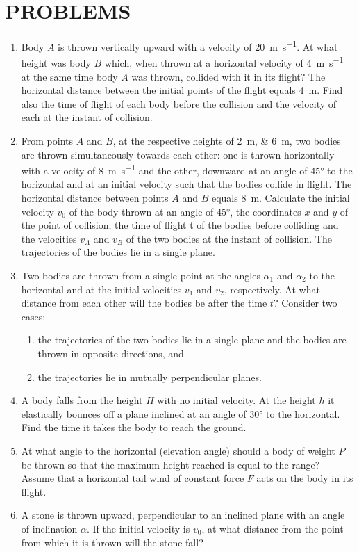 \documentclass[a4paper,sfsidenotes]{tufte-book}
\begin{document}
\section{PROBLEMS}
\label{problems-01}
\begin{enumerate}[series=problems]
\item Body $A$ is thrown vertically upward with a velocity of \SI[per-mode=symbol]{20}{\meter \per \second}. At what height was body $B$ which, when thrown at a horizontal velocity of  \SI[per-mode=symbol]{4}{\meter \per \second} at the same time body $A$ was thrown, collided with it in its
flight? The horizontal distance between the initial points of the flight equals \SI{4}{m}. Find also the time of flight of each body before the collision and the velocity of each at the instant of collision.
\item From points $A$ and $B$, at the respective heights of \SIlist{2;6}{\metre}, two bodies are thrown simultaneously towards each other: one is thrown horizontally with a velocity of \SI[per-mode=symbol]{8}{\meter \per \second} and the other, downward at an angle of \ang{45} to the horizontal and at an initial velocity such that the bodies collide in flight. The horizontal distance between points $A$ and $B$ equals \SI{8}{m}. Calculate the initial velocity $v_{0}$ of the body thrown at an angle of \ang{45}, the coordinates $x$ and $y$ of the point of collision, the time of flight t of the bodies before colliding and the velocities $v_{A}$ and $v_{B}$ of the two bodies at the instant of collision. The trajectories of the bodies lie in a single plane.
\item Two bodies are thrown from a single point at the angles $\alpha_{1}$ and $\alpha_{2}$ to the horizontal and at the initial velocities $v_{1}$ and $v_{2}$, respectively. At what distance from each other will the bodies be after the time $t$? Consider two cases: 
\begin{enumerate}[label=(\arabic*)]
\item the trajectories of the two bodies lie in a single plane and the bodies are thrown in opposite directions, and 
\item the trajectories lie in mutually perpendicular planes.
\end{enumerate}
\item A body falls from the height $H$ with no initial velocity. At the height $h$ it elastically bounces off a plane inclined at an angle of \ang{30} to the horizontal. Find the time it takes the body to reach the ground.
\item At what angle to the horizontal (elevation angle) should a body of weight $P$ be thrown so that the maximum height reached is equal to the range? Assume that a horizontal tail wind of constant force $F$ acts on the body in its flight.
\item A stone is thrown upward, perpendicular to an inclined plane with an angle of inclination $\alpha$. If the initial velocity is $v_{0}$, at what distance from the point from which it is thrown will the stone fall?


\end{enumerate}
\end{document}
